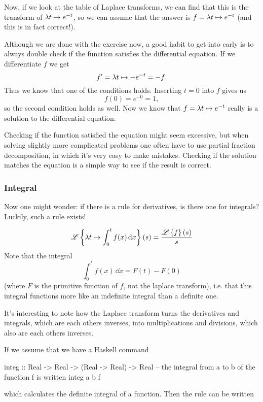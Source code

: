 \begin{solution}
Now, if we look at the table of Laplace transforms, we can find that this is the transform of $\lambda t \mapsto e^{-t}$, so we can assume that the answer is $f = \lambda t \mapsto e^{-t}$ (and this is in fact correct!).

Although we are done with the exercise now, a good habit to get into early is to always double check if the function satisfies the differential equation. If we differentiate $f$ we get
\begin{equation*}
    f' = \lambda t \mapsto -e^{-t} = - f.
\end{equation*}
Thus we know that one of the conditions holds. Inserting $t=0$ into $f$ gives us 
\begin{equation*}
    f(0) = e^{-0} = 1,
\end{equation*}
so the second condition holds as well. Now we know that $f = \lambda t \mapsto e^{-t}$ really is a solution to the differential equation. 

Checking if the function satisfied the equation might seem excessive, but when solving slightly more complicated problems one often have to use partial fraction decomposition, in which it's very easy to make mistakes. Checking if the solution matches the equation is a simple way to see if the result is correct. 
\end{solution}


\subsubsection{Integral} 
Now one might wonder: if there is a rule for derivatives, is there one for integrals? Luckily, such a rule exists! 

\begin{equation*}
    \mathscr{L} \left\{ \lambda t\mapsto \int_0^t f(x)\, \dd x \right\}(s) = \frac{\mathscr{L} \left\{f\right\}(s)}{s}
\end{equation*}
Note that the integral 
\begin{equation*}
    \int_0^t f(x)\, \dd x = F(t) - F(0) 
\end{equation*}
(where $F$ is the primitive function of $f$, not the laplace transform), i.e. that this integral functions more like an indefinite integral than a definite one. 


It's interesting to note how the Laplace transform turns the derivatives and integrals, which are each others inverses, into multiplications and divisions, which also are each others inverses. 

If we assume that we have a Haskell command 
\begin{code}
integ :: Real -> Real -> (Real -> Real) -> Real 
-- the integral from a to b of the function f is written integ a b f
\end{code} 
which calculates the definite integral of a function. Then the rule can be written

